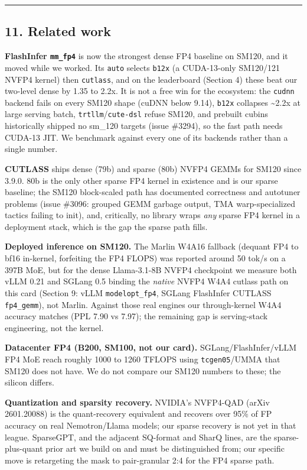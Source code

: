 \documentclass[
]{article}
\begin{document}
\begin{center}\rule{0.5\linewidth}{0.5pt}\end{center}

\subsection{11. Related work}\label{related-work}

\textbf{FlashInfer \texttt{mm\_fp4}} is now the strongest dense FP4
baseline on SM120, and it moved while we worked. Its \texttt{auto}
selects \texttt{b12x} (a CUDA-13-only SM120/121 NVFP4 kernel) then
\texttt{cutlass}, and on the leaderboard (Section 4) these beat our
two-level dense by 1.35 to 2.2x. It is not a free win for the ecosystem:
the \texttt{cudnn} backend fails on every SM120 shape (cuDNN below
9.14), \texttt{b12x} collapses \textasciitilde2.2x at large serving
batch, \texttt{trtllm}/\texttt{cute-dsl} refuse SM120, and prebuilt
cubins historically shipped no sm\_120 targets (issue \#3294), so the
fast path needs CUDA-13 JIT. We benchmark against every one of its
backends rather than a single number.

\textbf{CUTLASS} ships dense (79b) and sparse (80b) NVFP4 GEMMs for
SM120 since 3.9.0. 80b is the only other sparse FP4 kernel in existence
and is our sparse baseline; the SM120 block-scaled path has documented
correctness and autotuner problems (issue \#3096: grouped GEMM garbage
output, TMA warp-specialized tactics failing to init), and, critically,
no library wraps \emph{any} sparse FP4 kernel in a deployment stack,
which is the gap the sparse path fills.

\textbf{Deployed inference on SM120.} The Marlin W4A16 fallback (dequant
FP4 to bf16 in-kernel, forfeiting the FP4 FLOPS) was reported around 50
tok/s on a 397B MoE, but for the dense Llama-3.1-8B NVFP4 checkpoint we
measure both vLLM 0.21 and SGLang 0.5 binding the \emph{native} NVFP4
W4A4 cutlass path on this card (Section 9: vLLM \texttt{modelopt\_fp4},
SGLang FlashInfer CUTLASS \texttt{fp4\_gemm}), not Marlin. Against those
real engines our through-kernel W4A4 accuracy matches (PPL 7.90 vs
7.97); the remaining gap is serving-stack engineering, not the kernel.

\textbf{Datacenter FP4 (B200, SM100, not our card).}
SGLang/FlashInfer/vLLM FP4 MoE reach roughly 1000 to 1260 TFLOPS using
\texttt{tcgen05}/UMMA that SM120 does not have. We do not compare our
SM120 numbers to these; the silicon differs.

\textbf{Quantization and sparsity recovery.} NVIDIA's NVFP4-QAD (arXiv
2601.20088) is the quant-recovery equivalent and recovers over 95\% of
FP accuracy on real Nemotron/Llama models; our sparse recovery is not
yet in that league. SparseGPT, and the adjacent SQ-format and SharQ
lines, are the sparse-plus-quant prior art we build on and must be
distinguished from; our specific move is retargeting the mask to
pair-granular 2:4 for the FP4 sparse path.
\end{document}
